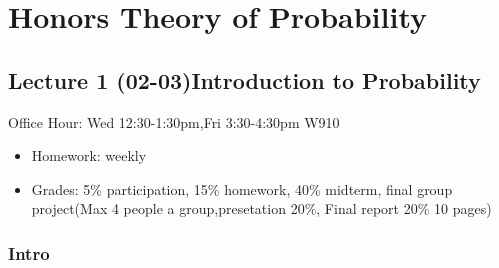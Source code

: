 \chapter[Honors Theory of Probability ]{Honors Theory of Probability}
\section[Lecture 1 (02-03) -- {Introduction to Probability}]{Lecture 1 (02-03)Introduction to Probability}
Office Hour: Wed 12:30-1:30pm,Fri 3:30-4:30pm W910
\begin{itemize}
    \item Homework: weekly
    \item Grades: 5\% participation, 15\% homework, 40\% midterm, final group project(Max 4 people a group,presetation 20\%, Final report 20\% 10 pages)
\end{itemize}

\subsection{Intro}

